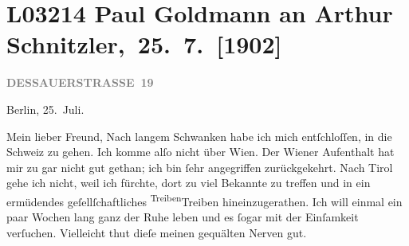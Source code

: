 

\section[ Paul Goldmann an Arthur Schnitzler, 25. 7. {[}1902{]}]{L03214 Paul Goldmann an Arthur Schnitzler, 25. 7. {[}1902{]}}
\nopagebreak{}
\rehead{ }\normalsize\beginnumbering{}
\toendnotes[C]{\smallbreak\pagebreak[2]}
\toendnotes[C]{\smallbreak}
\pstart
           \raggedleft{}{\pb}\textcolor{gray}{\textbf{DESSAUERSTRASSE 19}}\pend
           
\pstart
           Berlin, 25. Juli.\pend
           
\pstart\center{}Mein lieber Freund,\pend\vspace{0.5em}
\pstart
           Nach langem Schwanken habe ich mich entſchloſſen, in die Schweiz zu gehen. Ich komme alſo nicht über Wien. Der Wiener Aufenthalt
               hat mir zu \label{K_L03214-1v}\label{K_L03214-1} gar nicht gut gethan; ich  bin ſehr
               angegriffen zurückgekehrt. Nach Tirol
               gehe ich nicht, weil ich fürchte, dort zu viel Bekannte zu treffen und in ein
               ermüdendes geſellſchaftliches {\pb}\substVorne{}\textsuperscript{Treiben}\substDazwischen{}Treiben\substHinten{} hineinzugerathen. Ich will einmal ein paar Wochen lang ganz der Ruhe leben
               und es ſogar mit der Einſamkeit verſuchen. Vielleicht thut dieſe meinen gequälten
               Nerven gut.\pend
           
